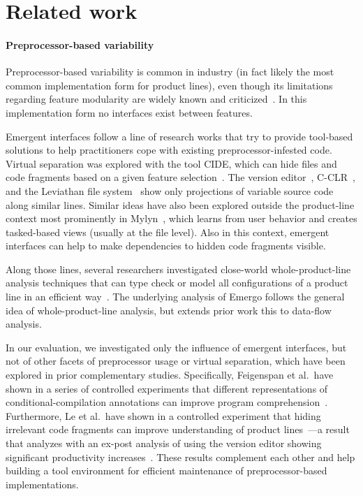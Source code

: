 
\section{Related work}

\label{sec:relatedwork}



\paragraph{Preprocessor-based variability}
Preprocessor-based variability is common in industry (in fact likely the most common implementation form for product lines), even though its limitations regarding feature modularity are widely known and criticized~\cite{ifdef-harmful, F:EWSM95}. In this implementation form no interfaces exist between features.

Emergent interfaces follow a line of research works that try to provide tool-based solutions to help practitioners cope with existing preprocessor-infested code.
Virtual separation was explored with the tool CIDE, which can hide files and code fragments based on a given feature selection~\cite{christian-cide-icse08}. The version editor~\cite{ABGM:TSE02}, C-CLR~\cite{SGC:ACP4IS07}, and the Leviathan file system~\cite{HEBSL:FOSD11} show only projections of variable source code along similar lines. Similar ideas have also been explored outside the product-line context most prominently in Mylyn~\cite{murphy-mylyn-fse2006}, which learns from user behavior and creates tasked-based views (usually at the file level). Also in this context, emergent interfaces can help to make dependencies to hidden code fragments visible. 

Along those lines, several researchers investigated close-world whole-product-line analysis techniques that can type check or model all configurations of a product line in an efficient way~\cite{batory-safe-composition-gpce07,KATS:TOSEM11,KOE:OOPSLA12}. The underlying analysis of Emergo follows the general idea of whole-product-line analysis, but extends prior work this to data-flow analysis.

In our evaluation, we investigated only the influence of emergent interfaces, but not of other facets of preprocessor usage or virtual separation, which have been explored in prior complementary studies. Specifically, Feigenspan et al.\ have shown in a series of controlled experiments that different representations of conditional-compilation annotations can improve program comprehension~\cite{FKALSDPLS:ESE12}. Furthermore, Le et al.\ have shown in a controlled experiment that hiding irrelevant code fragments can improve understanding of product lines~\cite{erwig-harmful}---a result that analyzes with an ex-post analysis of using the version editor showing significant productivity increases~\cite{ABGM:TSE02}. These results complement each other and help building a tool environment for efficient maintenance of preprocessor-based implementations.

